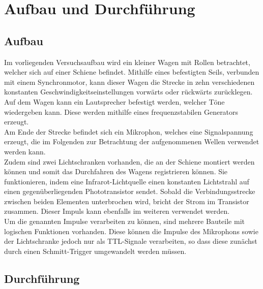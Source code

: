 \section{Aufbau und Durchführung}
\subsection{Aufbau}
\label{sec:Aufbau}
Im vorliegenden Versuchsaufbau wird ein kleiner Wagen mit Rollen betrachtet, welcher sich auf einer Schiene befindet.
Mithilfe eines befestigten Seils, verbunden mit einem Synchronmotor, kann dieser Wagen die Strecke in zehn verschiedenen konstanten Geschwindigkeitseinstellungen vorwärts oder rückwärts zurücklegen.
Auf dem Wagen kann ein Lautsprecher befestigt werden, welcher Töne wiedergeben kann.
Diese werden mithilfe eines frequenzstabilen Generators erzeugt.\\
Am Ende der Strecke befindet sich ein Mikrophon, welches eine Signalspannung erzeugt, die im Folgenden zur Betrachtung der aufgenommenen Wellen verwendet werden kann.\\
Zudem sind zwei Lichtschranken vorhanden, die an der Schiene montiert werden können und somit das Durchfahren des Wagens registrieren können.
Sie funktionieren, indem eine Infrarot-Lichtquelle einen konstanten Lichtstrahl auf einen gegenüberliegenden Phototransistor sendet.
Sobald die Verbindungsstrecke zwischen beiden Elementen unterbrochen wird, bricht der Strom im Transistor zusammen.
Dieser Impuls kann ebenfalls im weiteren verwendet werden.\\
Um die genannten Impulse verarbeiten zu können, sind mehrere Bauteile mit logischen Funktionen vorhanden.
Diese können die Impulse des Mikrophons sowie der Lichtschranke jedoch nur als TTL-Signale verarbeiten, so dass diese zunächst durch einen Schmitt-Trigger umgewandelt werden müssen.

\subsection{Durchführung}
